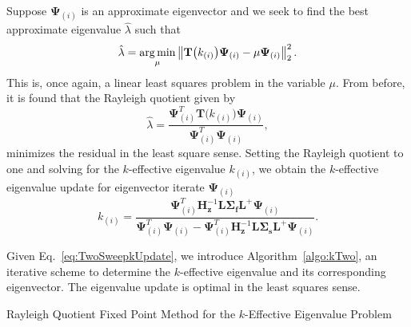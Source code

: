 Suppose $\mathbf{\Psi}_{(i)}$ is an approximate eigenvector and we seek to find the best approximate eigenvalue $\hat{\lambda}$ such that
\begin{equation}
\hat{\lambda} = \operatorname*{arg\,min}_{\mu} \left\lVert\mathbf{T}\big (k_{(i)} \big ) \mathbf{\Psi}_{(i)} - \mu \mathbf{\Psi}_{(i)}\right\rVert_{2}^{2}. 
\end{equation}
This is, once again, a linear least squares problem in the variable $\mu$. From before, it is found that the Rayleigh quotient given by
\begin{equation}
	\hat{\lambda} = \frac{\mathbf{\Psi}^{T}_{(i)} \mathbf{T}\big (k_{(i)} \big ) \mathbf{\Psi}_{(i)}}{\mathbf{\Psi}^{T}_{(i)}\mathbf{\Psi}_{(i)}},
\end{equation}
minimizes the residual in the least square sense. Setting the Rayleigh quotient to one and solving for the $k$-effective eigenvalue $k_{(i)}$, we obtain the $k$-effective eigenvalue update for eigenvector iterate $\mathbf{\Psi}_{(i)}$
\begin{equation}
	k_{(i)} = \frac{\mathbf{\Psi}^{T}_{(i)} \mathbf{H}_{\mathbf{z}}^{-1} \mathbf{L} \mathbf{\Sigma_{f}} \mathbf{L}^{+} \mathbf{\Psi}_{(i)}}{\mathbf{\Psi}^{T}_{(i)}\mathbf{\Psi}_{(i)} - \mathbf{\Psi}^{T}_{(i)} \mathbf{H}_{\mathbf{z}}^{-1} \mathbf{L} \mathbf{\Sigma_{s}} \mathbf{L}^{+} \mathbf{\Psi}_{(i)}}.
	\label{eq:TwoSweepkUpdate}
\end{equation}

Given Eq.~\ref{eq:TwoSweepkUpdate}, we introduce Algorithm~\ref{algo:kTwo}, an iterative scheme to determine the $k$-effective eigenvalue and its corresponding eigenvector. The eigenvalue update is optimal in the least squares sense.

\begin{algorithm}[t]
	\caption{Rayleigh Quotient Fixed Point Method for the $k$-Effective Eigenvalue Problem}
	\label{algo:kTwo}
	\begin{algorithmic}
		\ENDWHILE
	\end{algorithmic}
\end{algorithm}

